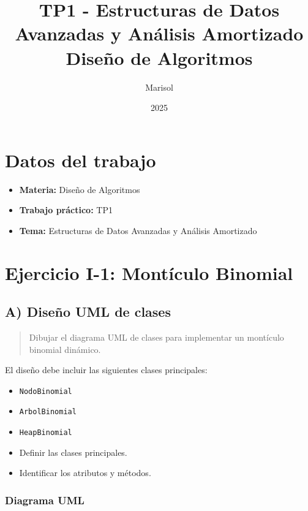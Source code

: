\documentclass[11pt]{article}
\author{Marisol}
\date{2025}
\title{TP1 - Estructuras de Datos Avanzadas y Análisis Amortizado\\\medskip
\large Diseño de Algoritmos}
\begin{document}
\maketitle
\setcounter{tocdepth}{2}
\tableofcontents


\section{Datos del trabajo}
\label{sec:org3fc47ad}

\begin{itemize}
\item \textbf{Materia:} Diseño de Algoritmos
\item \textbf{Trabajo práctico:} TP1
\item \textbf{Tema:} Estructuras de Datos Avanzadas y Análisis Amortizado
\end{itemize}

\section{Ejercicio I-1: Montículo Binomial}
\label{sec:orgef7dd99}

\subsection{A) Diseño UML de clases}
\label{sec:orgc4b12c8}

\begin{quote}
Dibujar el diagrama UML de clases para implementar un montículo binomial dinámico.
\end{quote}

El diseño debe incluir las siguientes clases principales:

\begin{itemize}
\item \texttt{NodoBinomial}
\item \texttt{ArbolBinomial}
\item \texttt{HeapBinomial}

\item[{$\square$}] Definir las clases principales.
\item[{$\square$}] Identificar los atributos y métodos.
\end{itemize}



\subsubsection{Diagrama UML}
\label{sec:orgc26d299}
\end{document}
